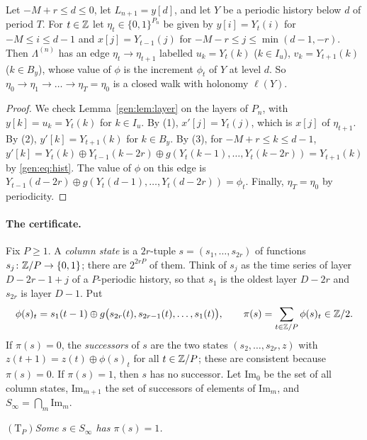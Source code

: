 \begin{lemma}\label{gen:lem:loops}
Let $-M+r\le d\le0$, let $L_{n+1}=y[d]$, and let $Y$ be a periodic history below $d$ of period $T$. For $t\in\mathbb{Z}$ let $\eta_t\in\{0,1\}^{P_n}$ be given by $y[i]=Y_t(i)$ for $-M\le i\le d-1$ and $x[j]=Y_{t-1}(j)$ for $-M-r\le j\le\min(d-1,-r)$. Then $\Lambda^{(n)}$ has an edge $\eta_t\to\eta_{t+1}$ labelled $u_k=Y_t(k)$ ($k\in I_u$), $v_k=Y_{t+1}(k)$ ($k\in B_y$), whose value of $\phi$ is the increment $\phi_t$ of $Y$ at level $d$. So $\eta_0\to\eta_1\to\dots\to\eta_T=\eta_0$ is a closed walk with holonomy $\ell(Y)$.
\end{lemma}

\begin{proof}
We check Lemma~\ref{gen:lem:layer} on the layers of $P_n$, with $y[k]=u_k=Y_t(k)$ for $k\in I_u$. By (1), $x'[j]=Y_t(j)$, which is $x[j]$ of $\eta_{t+1}$. By (2), $y'[k]=Y_{t+1}(k)$ for $k\in B_y$. By (3), for $-M+r\le k\le d-1$, $y'[k]=Y_t(k)\oplus Y_{t-1}(k-2r)\oplus g(Y_t(k-1),\dots,Y_t(k-2r))=Y_{t+1}(k)$ by \eqref{gen:eq:hist}. The value of $\phi$ on this edge is $Y_{t-1}(d-2r)\oplus g(Y_t(d-1),\dots,Y_t(d-2r))=\phi_t$. Finally, $\eta_T=\eta_0$ by periodicity.
\end{proof}

\paragraph{The certificate.} Fix $P\ge1$. A \emph{column state} is a $2r$-tuple $s=(s_1,\dots,s_{2r})$ of functions $s_j\colon\mathbb{Z}/P\to\{0,1\}$; there are $2^{2rP}$ of them. Think of $s_j$ as the time series of layer $D-2r-1+j$ of a $P$-periodic history, so that $s_1$ is the oldest layer $D-2r$ and $s_{2r}$ is layer $D-1$. Put
\[
\phi(s)_t=s_1(t-1)\oplus g\bigl(s_{2r}(t),s_{2r-1}(t),\dots,s_1(t)\bigr),\qquad \pi(s)=\sum_{t\in\mathbb{Z}/P}\phi(s)_t\in\mathbb{Z}/2 .
\]
If $\pi(s)=0$, the \emph{successors} of $s$ are the two states $(s_2,\dots,s_{2r},z)$ with $z(t+1)=z(t)\oplus\phi(s)_t$ for all $t\in\mathbb{Z}/P$; these are consistent because $\pi(s)=0$. If $\pi(s)=1$, then $s$ has no successor. Let $\mathrm{Im}_0$ be the set of all column states, $\mathrm{Im}_{m+1}$ the set of successors of elements of $\mathrm{Im}_m$, and $S_\infty=\bigcap_m\mathrm{Im}_m$.

\smallskip
\noindent$(\mathrm T_P)$\quad\emph{Some $s\in S_\infty$ has $\pi(s)=1$.}

